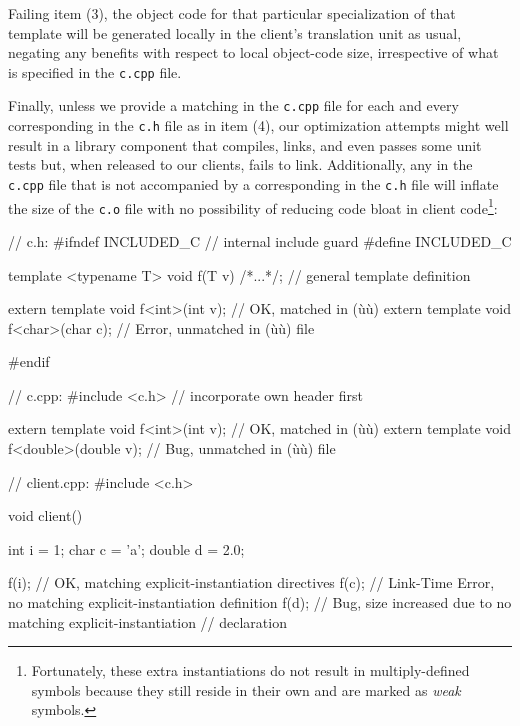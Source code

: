 Failing item (3), the object code for that particular specialization of
that template will be generated locally in the client's translation unit
as usual, negating any benefits with respect to local object-code size,
irrespective of what is specified in the \lstinline!c.cpp! file.

Finally, unless we provide a matching  in the \lstinline!c.cpp! file for each and every
corresponding  in the
\lstinline!c.h! file as in item (4), our optimization attempts might well
result in a library component that compiles, links, and even passes some
unit tests but, when released to our clients, fails to link.
Additionally, any  in
the \lstinline!c.cpp! file that is not accompanied by a corresponding
 in the \lstinline!c.h!
file will inflate the size of the \lstinline!c.o! file with no possibility
of reducing code bloat in client code{\cprotect\footnote{Fortunately,
these extra instantiations do not result in multiply-defined symbols
because they still reside in their own  and are marked
  as \emph{weak} symbols.}}:

\begin{emcppslisting}[emcppsbatch=e7]
// c.h:
#ifndef INCLUDED_C                            // internal include guard
#define INCLUDED_C

template <typename T> void f(T v) {/*...*/};  // general template definition

extern template void f<int>(int v);           // OK, matched in (ù{}ù)
extern template void f<char>(char c);         // Error, unmatched in (ù{}ù) file

#endif
\end{emcppslisting}
\vspace*{2ex}   %
\begin{emcppslisting}[emcppsbatch=e7]
// c.cpp:
#include <c.h>                                 // incorporate own header first

extern template void f<int>(int v);            // OK, matched in (ù{}ù)
extern template void f<double>(double v);      // Bug, unmatched in (ù{}ù) file
\end{emcppslisting}
\vspace*{2ex}   %
\begin{emcppslisting}[emcppsbatch=e7]
// client.cpp:
#include <c.h>

void client()
{
    int    i = 1;
    char   c = 'a';
    double d = 2.0;

    f(i);  // OK, matching explicit-instantiation directives
    f(c);  // Link-Time Error, no matching explicit-instantiation definition
    f(d);  // Bug, size increased due to no matching explicit-instantiation
           // declaration
}
\end{emcppslisting}

